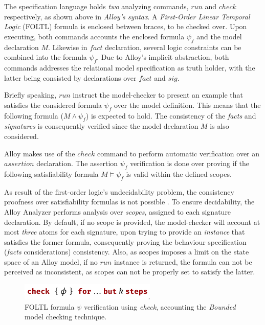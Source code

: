 The specification language holds \textit{two} analyzing commands, $run$ and $check$ respectively, as shown above in \textit{Alloy's syntax}. A \textit{First-Order Linear Temporal Logic} (FOLTL) formula is enclosed between braces, to be checked over. Upon executing, both commands accounts the enclosed formula $\psi_{f}$ and the model declaration ${M}$. Likewise in $fact$ declaration, several logic constraints can be combined into the formula $\psi_{f}$. Due to Alloy's implicit abstraction, both commands addresses the relational model specification as truth holder, with the latter being consisted by declarations over $fact$ and $sig$. 

Briefly speaking, $run$ instruct the model-checker to present an example that satisfies the considered formula $\psi_{f}$ over the model definition. This means that the following formula ($M \wedge \psi_{f}$) is expected to hold. The consistency of the \textit{facts} and \textit{signatures} is consequently verified since the model declaration $M$ is also considered. 

Alloy makes use of the $check$ command to perform automatic verification over an $assertion$ declaration. The assertion $\psi_{f}$ verification is done over proving if the following satisfiability formula $M \models \psi_{f}$ is valid within the defined scopes. %

As result of the first-order logic's undecidability problem, the consistency proofness over satisfiability formulas is not possible \cite{vakili2012temporal}. To ensure decidability, the Alloy Analyzer performs analysis over \textit{scopes}, assigned to each signature declaration. By default, if no scope is provided, the model-checker will account at most \textit{three} atoms for each signature, upon trying to provide an \textit{instance} that satisfies the former formula, consequently proving the behaviour specification (\textit{facts} considerations) consistency. Also, as scopes imposes a limit on the state space of an Alloy model, if no $run$ instance is returned, the formula can not be perceived as inconsistent, as scopes can not be properly set to satisfy the latter.

\begin{figure}[H]
    \centering
    \includegraphics[width=0.4\linewidth]{img/check_alloy_1.png}
    \caption{FOLTL formula $\psi$ verification using \textit{check}, accounting the \textit{Bounded} model checking technique.}
    \label{fig:alloy-check-1}
\end{figure}

